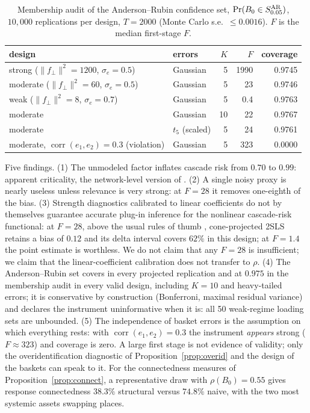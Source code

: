 \documentclass[12pt]{article}
\theoremstyle{plain}\newtheorem{theorem}{Theorem}[section]\newtheorem{proposition}[theorem]{Proposition}\newtheorem{lemma}[theorem]{Lemma}\newtheorem{corollary}[theorem]{Corollary}
\theoremstyle{definition}\newtheorem{definition}[theorem]{Definition}\newtheorem{assumption}[theorem]{Assumption}\newtheorem{remark}[theorem]{Remark}
\begin{document}
\begin{table}[t]\centering\small
\caption{Membership audit of the Anderson--Rubin confidence set, $\Pr(B_0\in S^{\rm AR}_{0.05})$, $10{,}000$ replications per design, $T=2000$ (Monte Carlo s.e.\ $\le0.0016$). $F$ is the median first-stage $F$.}\label{tab:member}
\begin{tabular}{llrrr}\toprule
design & errors & $K$ & $F$ & coverage\\\midrule
strong ($\|f_\perp\|^2=1200$, $\sigma_e=0.5$) & Gaussian & 5 & 1990 & 0.9745\\
moderate ($\|f_\perp\|^2=60$, $\sigma_e=0.5$) & Gaussian & 5 & 23 & 0.9746\\
weak ($\|f_\perp\|^2=8$, $\sigma_e=0.7$) & Gaussian & 5 & 0.4 & 0.9763\\
moderate & Gaussian & 10 & 22 & 0.9767\\
moderate & $t_5$ (scaled) & 5 & 24 & 0.9761\\
moderate, $\operatorname{corr}(e_1,e_2)=0.3$ (violation) & Gaussian & 5 & 323 & 0.0000\\\bottomrule
\end{tabular}
\end{table}

Five findings. (1) The unmodeled factor inflates cascade risk from $0.70$ to $0.99$: apparent criticality, the network-level version of \citet{filimonov2015}. (2) A single noisy proxy is nearly useless unless relevance is very strong: at $F=28$ it removes one-eighth of the bias. (3) Strength diagnostics calibrated to linear coefficients do not by themselves guarantee accurate plug-in inference for the nonlinear cascade-risk functional: at $F=28$, above the usual rules of thumb \citep{stockyogo2005}, cone-projected 2SLS retains a bias of $0.12$ and its delta interval covers $62\%$ in this design; at $F=1.4$ the point estimate is worthless. We do not claim that any $F=28$ is insufficient; we claim that the linear-coefficient calibration does not transfer to $\rho$. (4) The Anderson--Rubin set covers in every projected replication and at $0.975$ in the membership audit in every valid design, including $K=10$ and heavy-tailed errors; it is conservative by construction (Bonferroni, maximal residual variance) and declares the instrument uninformative when it is: all 50 weak-regime loading sets are unbounded. (5) The independence of basket errors is the assumption on which everything rests: with $\operatorname{corr}(e_1,e_2)=0.3$ the instrument \emph{appears} strong ($F\approx323$) and coverage is zero. A large first stage is not evidence of validity; only the overidentification diagnostic of Proposition~\ref{prop:overid} and the design of the baskets can speak to it. For the connectedness measures of Proposition~\ref{prop:connect}, a representative draw with $\rho(B_0)=0.55$ gives response connectedness $38.3\%$ structural versus $74.8\%$ naive, with the two most systemic assets swapping places.
\end{document}
